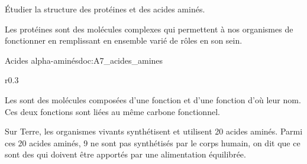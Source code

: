 \tetePremStssBiol
\vspace*{-36pt}

\begin{objectifs}
  \item Étudier la structure des protéines et des acides aminés.
\end{objectifs}

\begin{contexte}
  Les protéines sont des molécules complexes qui permettent à nos organismes de fonctionner en remplissant en ensemble varié de rôles en son sein.

\end{contexte}



\begin{doc}{Acides alpha-aminés}{doc:A7_acides_amines}
  \vspace*{-24pt}
  \begin{wrapfigure}{r}{0.3\linewidth}
    \centering
    \vspace*{-13pt}
  \end{wrapfigure}
  \phantom{b}
  
  \begin{importants}
    Les  sont des molécules composées d'une fonction  et d'une fonction  d'où leur nom.
    Ces deux fonctions sont liées au même carbone fonctionnel.
  \end{importants}
  
  Sur Terre, les organismes vivants synthétisent et utilisent 20 acides aminés.
  Parmi ces 20 acides aminés, 9 ne sont pas synthétisés par le corps humain, on dit que ce sont des  qui doivent être apportés par une alimentation équilibrée.
\end{doc}

